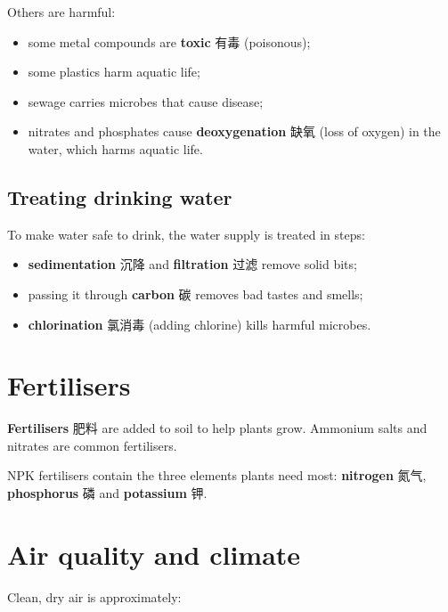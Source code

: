 \documentclass[11pt]{article}
\begin{document}
Others are harmful:

\begin{itemize}
\item some metal compounds are \textbf{toxic} 有毒 (poisonous);

\item some plastics harm aquatic life;

\item sewage carries microbes that cause disease;

\item nitrates and phosphates cause \textbf{deoxygenation} 缺氧 (loss of oxygen) in the water, which harms aquatic life.

\end{itemize}

\subsection*{Treating drinking water}

To make water safe to drink, the water supply is treated in steps:

\begin{itemize}
\item \textbf{sedimentation} 沉降 and \textbf{filtration} 过滤 remove solid bits;

\item passing it through \textbf{carbon} 碳 removes bad tastes and smells;

\item \textbf{chlorination} 氯消毒 (adding chlorine) kills harmful microbes.

\end{itemize}

\section*{Fertilisers}

\textbf{Fertilisers} 肥料 are added to soil to help plants grow. Ammonium salts and nitrates are common fertilisers.

NPK fertilisers contain the three elements plants need most: \textbf{nitrogen} 氮气, \textbf{phosphorus} 磷 and \textbf{potassium} 钾.

\section*{Air quality and climate}

Clean, dry air is approximately:
\end{document}
